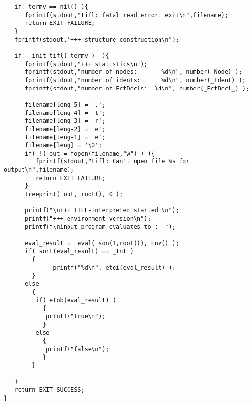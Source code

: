 \begin{verbatim}
   if( termv == nil() ){
      fprintf(stdout,"tifl: fatal read error: exit\n",filename);
      return EXIT_FAILURE;
   }
   fprintf(stdout,"+++ structure construction\n");

   if(  init_tifl( termv )  ){
      fprintf(stdout,"+++ statistics\n");
      fprintf(stdout,"number of nodes:       %d\n", number(_Node) );
      fprintf(stdout,"number of idents:      %d\n", number(_Ident) );
      fprintf(stdout,"number of FctDecls:  %d\n", number(_FctDecl_) );

      filename[leng-5] = '.';
      filename[leng-4] = 't';
      filename[leng-3] = 'r';
      filename[leng-2] = 'e';
      filename[leng-1] = 'e';
      filename[leng] = '\0';
      if( !( out = fopen(filename,"w") ) ){
         fprintf(stdout,"tifl: Can't open file %s for output\n",filename);
         return EXIT_FAILURE;
      }
      treeprint( out, root(), 0 );

      printf("\n+++ TIFL-Interpreter started!\n");
      printf("+++ environment version\n");
      printf("\ninput program evaluates to :  ");

      eval_result =  eval( son(1,root()), Env() );
      if( sort(eval_result) == _Int )
        {
              printf("%d\n", etoi(eval_result) );
        }
      else
        {
         if( etob(eval_result) )
           {
            printf("true\n");
           }
         else
           {
            printf("false\n");
           }
        }

   }
   return EXIT_SUCCESS;
}
\end{verbatim}

